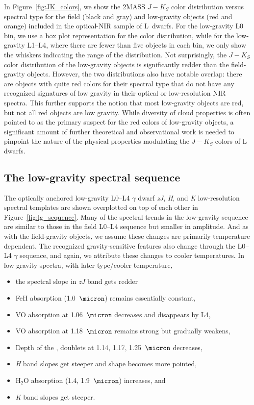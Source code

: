 \documentclass[modern]{aastex61}
\begin{document}
In Figure~\ref{fig:JK_colors}, we show the 2MASS $J-K_S$ color distribution versus spectral type for the field (black and gray) and low-gravity objects (red and orange) included in the optical-NIR sample of L~dwarfs.
For the low-gravity L0 bin, we use a box plot representation for the color distribution, while for the low-gravity L1--L4, where there are fewer than five objects in each bin, we only show the whiskers indicating the range of the distribution.
Not surprisingly, the $J-K_S$ color distribution of the low-gravity objects is significantly redder than the field-gravity objects.
However, the two distributions also have notable overlap: there are objects with quite red colors for their spectral type that do not have any recognized signatures of low gravity in their optical or low-resolution NIR spectra.
This further supports the notion that most low-gravity objects are red, but not all red objects are low gravity.
While diversity of cloud properties is often pointed to as the primary suspect for the red colors of low-gravity objects, a significant amount of further theoretical and observational work is needed to pinpoint the nature of the physical properties modulating the $J-K_S$ colors of L dwarfs.

\clearpage


\subsection{The low-gravity spectral sequence}

The optically anchored low-gravity L0--L4 $\gamma$ dwarf \emph{zJ}, \emph{H}, and \emph{K} low-resolution spectral templates are shown overplotted on top of each other in Figure~\ref{fig:lg_sequence}.
Many of the spectral trends in the low-gravity sequence are similar to those in the field L0--L4 sequence but smaller in amplitude. And as with the field-gravity objects, we assume these changes are primarily temperature dependent. The recognized gravity-sensitive features also change through the L0--L4 $\gamma$ sequence, and again, we attribute these changes to cooler temperatures.
In low-gravity spectra, with later type/cooler temperature,
\begin{itemize}
\item the spectral slope in \emph{zJ} band gets redder
\item FeH absorption (1.0~$\micron$) remains essentially constant,
\item VO absorption at 1.06~$\micron$ decreases and disappears by L4,
\item VO absorption at 1.18~$\micron$ remains strong but gradually weakens,
\item Depth of the ,  doublets at 1.14, 1.17, 1.25~$\micron$ decreases,
\item \emph{H} band slopes get steeper and shape becomes more pointed,
\item H$_2$O absorption (1.4, 1.9~$\micron$) increases, and
\item \emph{K} band slopes get steeper.
\end{itemize}
\end{document}
